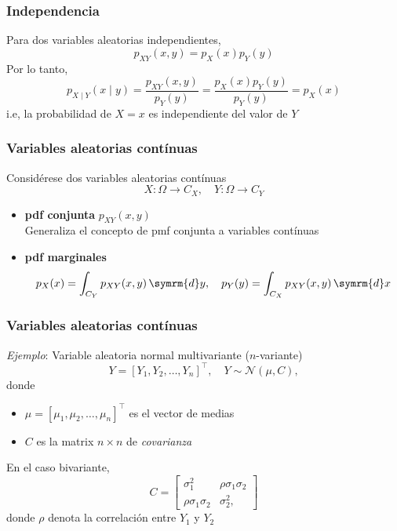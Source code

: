 \documentclass[xcolor=dvipsnames,10pt]{beamer}
\begin{document}
%
\begin{frame}
  \frametitle{Independencia}
  Para dos variables aleatorias independientes,
  \begin{equation*}
    p_{XY}(x, y) = p_X(x) p_Y(y)
  \end{equation*}
  Por lo tanto,
  \begin{equation*}
    p_{X \mid Y}(x \mid y) = \frac{p_{XY}(x, y)}{p_Y(y)} = \frac{p_X(x) p_Y(y)}{p_Y(y)} = p_X(x)
  \end{equation*}
  i.e, la probabilidad de $X = x$ es independiente del valor de $Y$
\end{frame}
%
\begin{frame}
  \frametitle{Variables aleatorias contínuas}
  Considérese dos variables aleatorias contínuas
  \begin{equation*}
    X \colon \Omega \to C_X, \quad Y \colon \Omega \to C_Y
  \end{equation*}
  \begin{itemize}
  \item \textbf{pdf conjunta} $p_{XY}(x, y)$\\
    Generaliza el concepto de pmf conjunta a variables contínuas
  \item \textbf{pdf marginales}
    \begin{equation*}
      p_X(x) = \int_{C_Y} p_{XY}(x, y) \, \symrm{d} y, \quad p_Y(y) = \int_{C_X} p_{XY}(x, y) \, \symrm{d} x
    \end{equation*}
  \end{itemize}
\end{frame}
%
\begin{frame}
  \frametitle{Variables aleatorias contínuas}
  \emph{Ejemplo}: Variable aleatoria normal multivariante ($n$-variante)
  \begin{equation*}
    Y = [Y_1, Y_2, \dots, Y_n]^{\top}, \quad Y \sim \mathcal{N}(\mu, C),
  \end{equation*}
  donde
  \begin{itemize}
  \item $\mu = [\mu_1, \mu_2, \dots, \mu_n]^{\top}$ es el vector de medias
  \item $C$ es la matrix $n \times n$ de \emph{covarianza}
  \end{itemize}
  En el caso bivariante,
  \begin{equation*}
    C =
    \begin{bmatrix}
      \sigma^2_1 & \rho \sigma_1 \sigma_2 \\ \rho \sigma_1 \sigma_2 & \sigma^2_2,
    \end{bmatrix}
  \end{equation*}
  donde $\rho$ denota la correlación entre $Y_1$ y $Y_2$
\end{frame}
\end{document}

